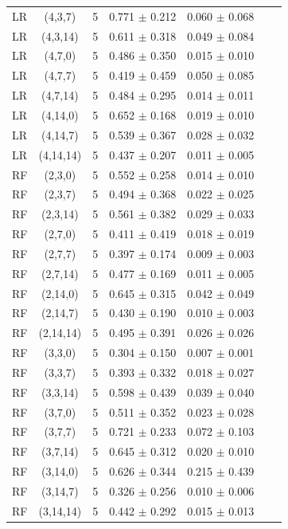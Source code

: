 \begin{longtable}{lcccccc}
LR & (4,3,7) & 5 & 0.771 $\pm$ 0.212 & 0.060 $\pm$ 0.068 \\
LR & (4,3,14) & 5 & 0.611 $\pm$ 0.318 & 0.049 $\pm$ 0.084 \\
LR & (4,7,0) & 5 & 0.486 $\pm$ 0.350 & 0.015 $\pm$ 0.010 \\
LR & (4,7,7) & 5 & 0.419 $\pm$ 0.459 & 0.050 $\pm$ 0.085 \\
LR & (4,7,14) & 5 & 0.484 $\pm$ 0.295 & 0.014 $\pm$ 0.011 \\
LR & (4,14,0) & 5 & 0.652 $\pm$ 0.168 & 0.019 $\pm$ 0.010 \\
LR & (4,14,7) & 5 & 0.539 $\pm$ 0.367 & 0.028 $\pm$ 0.032 \\
LR & (4,14,14) & 5 & 0.437 $\pm$ 0.207 & 0.011 $\pm$ 0.005 \\
RF & (2,3,0) & 5 & 0.552 $\pm$ 0.258 & 0.014 $\pm$ 0.010 \\
RF & (2,3,7) & 5 & 0.494 $\pm$ 0.368 & 0.022 $\pm$ 0.025 \\
RF & (2,3,14) & 5 & 0.561 $\pm$ 0.382 & 0.029 $\pm$ 0.033 \\
RF & (2,7,0) & 5 & 0.411 $\pm$ 0.419 & 0.018 $\pm$ 0.019 \\
RF & (2,7,7) & 5 & 0.397 $\pm$ 0.174 & 0.009 $\pm$ 0.003 \\
RF & (2,7,14) & 5 & 0.477 $\pm$ 0.169 & 0.011 $\pm$ 0.005 \\
RF & (2,14,0) & 5 & 0.645 $\pm$ 0.315 & 0.042 $\pm$ 0.049 \\
RF & (2,14,7) & 5 & 0.430 $\pm$ 0.190 & 0.010 $\pm$ 0.003 \\
RF & (2,14,14) & 5 & 0.495 $\pm$ 0.391 & 0.026 $\pm$ 0.026 \\
RF & (3,3,0) & 5 & 0.304 $\pm$ 0.150 & 0.007 $\pm$ 0.001 \\
RF & (3,3,7) & 5 & 0.393 $\pm$ 0.332 & 0.018 $\pm$ 0.027 \\
RF & (3,3,14) & 5 & 0.598 $\pm$ 0.439 & 0.039 $\pm$ 0.040 \\
RF & (3,7,0) & 5 & 0.511 $\pm$ 0.352 & 0.023 $\pm$ 0.028 \\
RF & (3,7,7) & 5 & 0.721 $\pm$ 0.233 & 0.072 $\pm$ 0.103 \\
RF & (3,7,14) & 5 & 0.645 $\pm$ 0.312 & 0.020 $\pm$ 0.010 \\
RF & (3,14,0) & 5 & 0.626 $\pm$ 0.344 & 0.215 $\pm$ 0.439 \\
RF & (3,14,7) & 5 & 0.326 $\pm$ 0.256 & 0.010 $\pm$ 0.006 \\
RF & (3,14,14) & 5 & 0.442 $\pm$ 0.292 & 0.015 $\pm$ 0.013 \\

\end{longtable}

